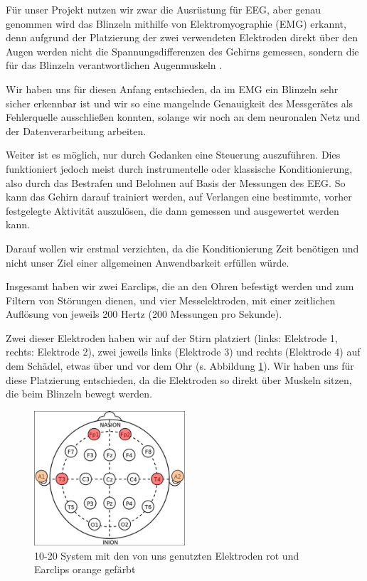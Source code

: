 \documentclass{scrartcl}
\begin{document}
	Für unser Projekt nutzen wir zwar die Ausrüstung für EEG, aber genau genommen wird das Blinzeln mithilfe von Elektromyographie (EMG) erkannt, denn aufgrund der Platzierung der zwei verwendeten Elektroden direkt über den Augen werden nicht die Spannungsdifferenzen des Gehirns gemessen, sondern die für das Blinzeln verantwortlichen Augenmuskeln \cite{wiki:EMG}.

	Wir haben uns für diesen Anfang entschieden, da im EMG ein Blinzeln sehr sicher erkennbar ist und wir so eine mangelnde Genauigkeit des Messgerätes als Fehlerquelle ausschließen konnten, solange wir noch an dem neuronalen Netz und der Datenverarbeitung arbeiten.


	Weiter ist es möglich, nur durch Gedanken eine Steuerung auszuführen. Dies funktioniert jedoch meist durch instrumentelle oder klassische Konditionierung, also durch das Bestrafen und Belohnen auf Basis der Messungen des EEG. So kann das Gehirn darauf trainiert werden, auf Verlangen eine bestimmte, vorher festgelegte Aktivität auszulösen, die dann gemessen und ausgewertet werden kann. \cite{BCIChaudhary}

	Darauf wollen wir erstmal verzichten, da die Konditionierung Zeit benötigen und nicht unser Ziel einer allgemeinen Anwendbarkeit erfüllen würde.

	Insgesamt haben wir zwei Earclips, die an den Ohren befestigt werden und zum Filtern von Störungen dienen, und vier Messelektroden, mit einer zeitlichen Auflösung von jeweils 200 Hertz (200 Messungen pro Sekunde).

	Zwei dieser Elektroden haben wir auf der Stirn platziert (links: Elektrode 1, rechts: Elektrode 2), zwei jeweils links (Elektrode 3) und rechts (Elektrode 4) auf dem Schädel, etwas über und vor dem Ohr (s. Abbildung \ref{10-20-System}). Wir haben uns für diese Platzierung entschieden, da die Elektroden so direkt über Muskeln sitzen, die beim Blinzeln bewegt werden. %

	\begin{figure}[h!]
		\centering
		\includegraphics[width=0.5\textwidth]{pictures/elektroden-platzierungen.png}
		\caption{10-20 System mit den von uns genutzten Elektroden rot und Earclips orange gefärbt}
		\label{10-20-System}
	\end{figure}
\end{document}
